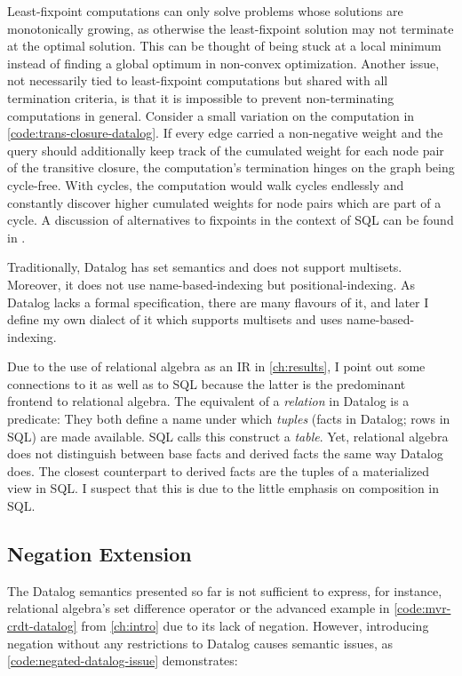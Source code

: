 Least-fixpoint computations can only solve problems whose solutions
are monotonically growing, as otherwise the least-fixpoint solution may not
terminate at the optimal solution.
This can be thought of being stuck at a local minimum instead of finding
a global optimum in non-convex optimization.
Another issue, not necessarily tied to least-fixpoint computations but shared
with all termination criteria, is that it is impossible to prevent
non-terminating computations in general.
Consider a small variation on the computation in \ref{code:trans-closure-datalog}.
If every edge carried a non-negative weight and the query should additionally
keep track of the cumulated weight for each node pair of the transitive closure,
the computation's termination hinges on the graph being cycle-free.
With cycles, the computation would walk cycles endlessly and constantly discover
higher cumulated weights for node pairs which are part of a cycle.
A discussion of alternatives to fixpoints in the context of SQL
can be found in \cite{hirn2023fix}.

Traditionally, Datalog has set semantics and does not support multisets.
Moreover, it does not use name-based-indexing but positional-indexing.
As Datalog lacks a formal specification, there are many flavours of it,
and later I define my own dialect of it which supports multisets and
uses name-based-indexing.

Due to the use of relational algebra as an \ac{IR} in \ref{ch:results},
I point out some connections to it as well as to SQL
because the latter is the predominant frontend to relational algebra.
The equivalent of a \emph{relation} in Datalog is a predicate:
They both define a name under which \emph{tuples} (facts in Datalog; rows in SQL)
are made available. SQL calls this construct a \emph{table}.
Yet, relational algebra does not distinguish between base facts and derived facts
the same way Datalog does.
The closest counterpart to derived facts are the tuples of a materialized view
in SQL.
I suspect that this is due to the little emphasis on composition in SQL.

\subsection{Negation Extension}

The Datalog semantics presented so far is not sufficient to express,
for instance, relational algebra's set difference operator or the advanced example
in \ref{code:mvr-crdt-datalog} from \ref{ch:intro} due to its lack of negation.
However, introducing negation without any restrictions to Datalog causes
semantic issues, as \ref{code:negated-datalog-issue} demonstrates:

